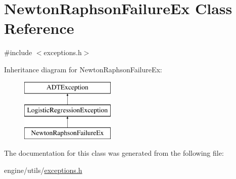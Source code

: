 \hypertarget{classNewtonRaphsonFailureEx}{
\section{NewtonRaphsonFailureEx Class Reference}
\label{classNewtonRaphsonFailureEx}
}


{\ttfamily \#include $<$exceptions.h$>$}

Inheritance diagram for NewtonRaphsonFailureEx:\begin{figure}[H]
\begin{center}
\leavevmode
\includegraphics[height=3cm]{classNewtonRaphsonFailureEx}
\end{center}
\end{figure}


The documentation for this class was generated from the following file:\begin{DoxyCompactItemize}
\item 
engine/utils/\hyperlink{exceptions_8h}{exceptions.h}\end{DoxyCompactItemize}

